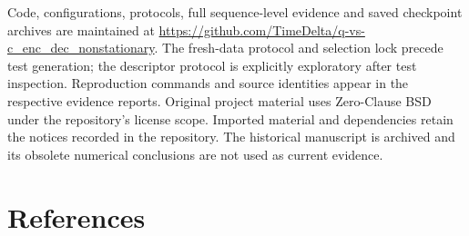 \documentclass[
  11pt,
]{article}
\begin{document}
Code, configurations, protocols, full sequence-level evidence and saved
checkpoint archives are maintained at
\url{https://github.com/TimeDelta/q-vs-c_enc_dec_nonstationary}. The
fresh-data protocol and selection lock precede test generation; the
descriptor protocol is explicitly exploratory after test inspection.
Reproduction commands and source identities appear in the respective
evidence reports. Original project material uses Zero-Clause BSD under
the repository's license scope. Imported material and dependencies
retain the notices recorded in the repository. The historical manuscript
is archived and its obsolete numerical conclusions are not used as
current evidence.

\hypertarget{references}{%
\section*{References}\label{references}}
\end{document}
